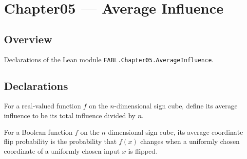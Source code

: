 \chapter{Chapter05 — Average Influence}
\section{Overview}

Declarations of the Lean module \texttt{FABL.Chapter05.AverageInfluence}.

\section{Declarations}

\begin{definition}
\label{FABL.averageInfluence}
\leanok
{}
For a real-valued function $f$ on the $n$-dimensional sign cube, define its average
influence to be its total influence divided by $n$.
\end{definition}

\begin{definition}
\label{FABL.averageCoordinateFlipProbability}
\leanok
{}
For a Boolean function $f$ on the $n$-dimensional sign cube, its average coordinate flip
probability is the probability that $f(x)$ changes when a uniformly chosen coordinate of
a uniformly chosen input $x$ is flipped.
\end{definition}


